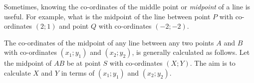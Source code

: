 \label{m39119*id68364}Sometimes, knowing the co-ordinates of the middle point or \textsl{midpoint} of a line is useful. For example, what is the midpoint of the line between point \begin{math}P\end{math} with co-ordinates \begin{math}\left(2;1\right)\end{math} and point \begin{math}Q\end{math} with co-ordinates \begin{math}\left(-2;-2\right)\end{math}.\par 
        \label{m39119*id68433}The co-ordinates of the midpoint of any line between any two points \begin{math}A\end{math} and \begin{math}B\end{math} with co-ordinates \begin{math}\left({x}_{1};{y}_{1}\right)\end{math} and \begin{math}\left({x}_{2};{y}_{2}\right)\end{math}, is generally calculated as follows. Let the midpoint of \begin{math}AB\end{math} be at point \begin{math}S\end{math} with co-ordinates \begin{math}\left(X;Y\right)\end{math}. The aim is to calculate \begin{math}X\end{math} and \begin{math}Y\end{math} in terms of \begin{math}\left({x}_{1};{y}_{1}\right)\end{math} and \begin{math}\left({x}_{2};{y}_{2}\right)\end{math}.\par 
        
    \setcounter{subfigure}{0}


